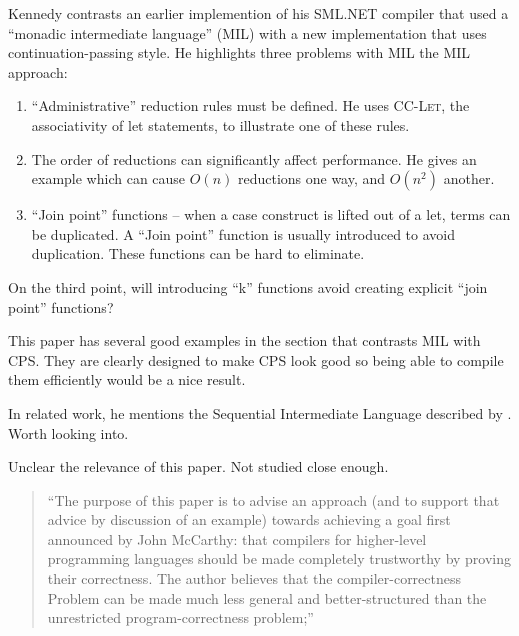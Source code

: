 \documentclass[11pt]{article}
\begin{document}


\bigskip

Kennedy contrasts an earlier implemention of his SML.NET compiler that
used a ``monadic intermediate language'' (MIL) with a new
implementation that uses continuation-passing style. He highlights
three problems with MIL the MIL approach:

\begin{enumerate}
\item ``Administrative'' reduction rules must be defined. He uses
  \textsc{CC-Let}, the associativity of let statements, to illustrate
  one of these rules.
\item The order of reductions can significantly affect performance. He
  gives an example which can cause $O(n)$ reductions one way, and
  $O(n^2)$ another.
\item ``Join point'' functions -- when a case construct is lifted out
  of a let, terms can be duplicated. A ``Join point'' function is
  usually introduced to avoid duplication. These functions can be hard
  to eliminate.
\end{enumerate}

On the third point, will introducing ``k'' functions avoid creating
explicit ``join point'' functions?

This paper has several good examples in the section that contrasts MIL
with CPS. They are clearly designed to make CPS look good so being
able to compile them efficiently would be a nice result.

In related work, he mentions the Sequential Intermediate Language described by
\citet{TOLMACH98FromML}. Worth looking into.

\bigskip
{}
\bigskip

Unclear the relevance of this paper. Not studied close enough.

\begin{quote}
``The purpose of this paper is to advise an approach (and to support
that advice by discussion of an example) towards achieving a goal
first announced by John McCarthy: that compilers for higher-level
programming languages should be made completely trustworthy by proving
their correctness. The author believes that the compiler-correctness
Problem can be made much less general and better-structured than the
unrestricted program-correctness problem;''
\end{quote}
\end{document}
